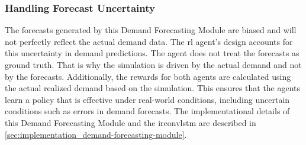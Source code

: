 \subsubsection{Handling Forecast Uncertainty}
The forecasts generated by this Demand Forecasting Module are biased and will not perfectly reflect the actual demand data.
The \gls{rl} agent's design accounts for this uncertainty in demand predictions.
The agent does not treat the forecasts as ground truth.
That is why the simulation is driven by the actual demand and not by the forecasts.
Additionally, the rewards for both agents are calculated using the actual realized demand based on the simulation.
This ensures that the agents learn a policy that is effective under real-world conditions, including uncertain conditions such as errors in demand forecasts.
The implementational details of this Demand Forecasting Module and the \gls{irconvlstm} are described in \autoref{sec:implementation_demand-forecasting-module}.

